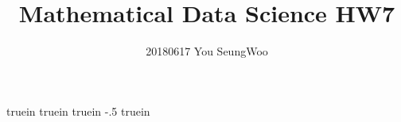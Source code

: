  truein 
 truein 
 truein 
\topmargin -.5 truein 
\textheight 8.5in
\setlength{\parindent}{0pt}
\hypersetup{
	colorlinks=true,
	linkcolor=red,
	filecolor=magenta,      
	urlcolor=cyan,
}


\title{Mathematical Data Science HW7}
\author{20180617 You SeungWoo}